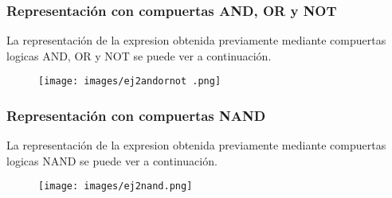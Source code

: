 \subsubsection{Representaci\'on con compuertas AND, OR y NOT}
\noindent
La representaci\'on de la expresion obtenida previamente mediante compuertas logicas AND, OR y NOT se puede ver a continuaci\'on.
\newpage
\begin{figure}[h!]
    \centering
    \begin{minipage}{0.85\textwidth}
        \centering
        \texttt{[image: images/ej2andornot .png]} %
         \label{fig:ej2andornot}
    \end{minipage}\hfill
\end{figure}

\subsubsection{Representaci\'on con compuertas NAND}
\noindent
La representaci\'on de la expresion obtenida previamente mediante compuertas logicas NAND se puede ver a continuaci\'on.

\begin{figure}[h!]
    \centering
    \begin{minipage}{0.85\textwidth}
        \centering
        \texttt{[image: images/ej2nand.png]} %
         \label{fig:ej2nand}
    \end{minipage}\hfill
\end{figure}
